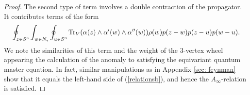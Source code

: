 \begin{proof}
The second type of term involves a double contraction of the propagator. 
It contributes terms of the form
\[
\oint_{z \in S^3} \int_{w \in N_\epsilon} \oint_{u \in S^3} {\rm Tr}_V(\alpha(z) \wedge \alpha'(w) \wedge \alpha''(w)) \rho(w) p(z-w) p(z-u) p(w-u) .
\]
We note the similarities of this term and the weight of the $3$-vertex wheel appearing the calculation of the anomaly to satisfying the equivariant quantum master equation. 
In fact, similar manipulations as in Appendix \ref{sec: feynman} show that it equals the left-hand side of (\ref{relationsb}), and hence the $A_\infty$-relation is satisfied.
%
\end{proof}


